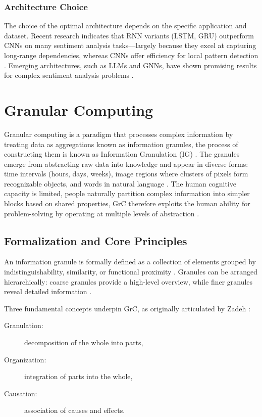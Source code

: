 \documentclass[a4paper,twoside,12pt]{book}
\begin{document}
\subsubsection{Architecture Choice}

The choice of the optimal architecture depends on the specific application and dataset. Recent research indicates that RNN variants (LSTM, GRU) outperform CNNs on many sentiment analysis tasks---largely because they excel at capturing long‑range dependencies, whereas CNNs offer efficiency for local pattern detection \cite{sharma2025review}. Emerging architectures, such as LLMs and GNNs, have shown promising results for complex sentiment analysis problems \cite{sharma2025review}.

\section{Granular Computing}

Granular computing is a paradigm that processes complex information by treating data as aggregations known as information granules, the process of constructing them is known as Information Granulation (IG) \cite{bargiela2003granular}. The granules emerge from abstracting raw data into knowledge and appear in diverse forms: time intervals (hours, days, weeks), image regions where clusters of pixels form recognizable objects, and words in natural language \cite{bargiela2003granular}. The human cognitive capacity is limited, people naturally partition complex information into simpler blocks based on shared properties, GrC therefore exploits the human ability for problem-solving by operating at multiple levels of abstraction \cite{qui2006GrC}.

\subsection{Formalization and Core Principles}

An information granule is formally defined as a collection of elements grouped by indistinguishability, similarity, or functional proximity \cite{Liping2009GrC}. Granules can be arranged hierarchically: coarse granules provide a high-level overview, while finer granules reveal detailed information \cite{Liping2009GrC}.


Three fundamental concepts underpin GrC, as originally articulated by Zadeh \cite{Zadeh1997GrC}:
\begin{description}
	\item[Granulation:] decomposition of the whole into parts,
	\item[Organization:] integration of parts into the whole,
	\item[Causation:] association of causes and effects.
\end{description}  
\end{document}
